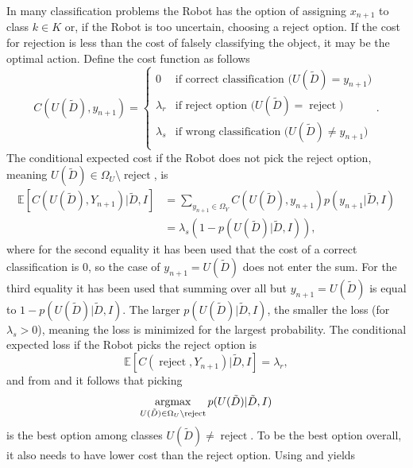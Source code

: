 \begin{example}
	In many classification problems the Robot has the option of assigning $x_{n+1}$ to class $k\in K$ or, if the Robot is too uncertain, choosing a reject option. If the cost for rejection is less than the cost of falsely classifying the object, it may be the optimal action. Define the cost function as follows
	\begin{equation}
		C(U(\tilde{D}),y_{n+1})=\begin{cases}
			0 & \text{if correct classification ($U(\tilde{D})=y_{n+1}$)}\\
			\lambda_r & \text{if reject option ($U(\tilde{D})=\operatorname{reject}$)}\\
			\lambda_s & \text{if wrong classification ($U(\tilde{D})\neq y_{n+1}$)}\\
		\end{cases}.
	\end{equation}
	The conditional expected cost if the Robot does not pick the reject option, meaning $U(\tilde{D})\in \Omega_U\setminus\operatorname{reject}$, is
	\begin{equation}
		\begin{split}
			\mathbb{E}[C(U(\tilde{D}), Y_{n+1})|\tilde{D},I] & = \sum_{y_{n+1}\in \Omega_Y} C(U(\tilde{D}),y_{n+1})p(y_{n+1}|\tilde{D},I)\\
			&= \lambda_s(1-p(U(\tilde{D})|\tilde{D},I)),
		\end{split}
		\label{eq:cost1a}
	\end{equation}
	where for the second equality it has been used that the cost of a correct classification is $0$, so the case of $y_{n+1}=U(\tilde{D})$ does not enter the sum. For the third equality it has been used that summing over all but $y_{n+1} =U(\tilde{D})$ is equal to $1-p(U(\tilde{D})|\tilde{D},I)$. The larger $p(U(\tilde{D})|\tilde{D},I)$, the smaller the loss (for $\lambda_s>0$), meaning the loss is minimized for the largest probability. The conditional expected loss if the Robot picks the reject option is
	\begin{equation}
		\mathbb{E}[C(\operatorname{reject}, Y_{n+1})|\tilde{D},I]=\lambda_r,
		\label{eq:cost2a}
	\end{equation}
	and from  and  it follows that picking 
	\begin{equation}
		\operatorname*{argmax}_{U(\tilde{D})\in \Omega_U\setminus \operatorname{reject}} p(U(\tilde{D})|\tilde{D},I)
	\end{equation}
	is the best option among classes $U(\tilde{D})\neq \operatorname{reject}$. To be the best option overall, it also needs to have lower cost than the reject option. Using  and  yields

\end{example}
